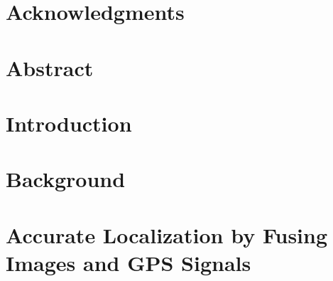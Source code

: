 \documentclass[11pt]{book}
\renewcommand{\baselinestretch}{1.2}
\begin{document}



\newpage
\thispagestyle{empty}
\renewcommand{\thesisdedication}{{\large Copyright \copyright~~ Kumar Vishal, 2015\\}{\large All Rights Reserved\\}}
\thesisdedicationpage



\newpage
\thispagestyle{empty}
\renewcommand{\thesisdedication}{\large To my family}
\thesisdedicationpage

\mastersthesis
\renewcommand{\baselinestretch}{1.5}

\chapter*{Acknowledgments}
\label{ch:ack}


\chapter*{Abstract}
\label{ch:abstract}


\tableofcontents
\listoffigures
\listoftables

\chapter{Introduction}
\label{ch:intro}



\chapter{Background}
\label{ch:chap2}



\chapter{Accurate Localization by Fusing Images and GPS Signals}
\label{ch:chap3}


\end{document}
